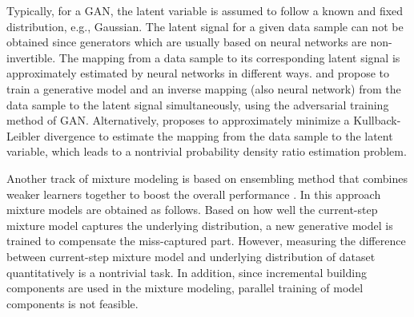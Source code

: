 Typically, for a GAN, the latent variable is assumed to follow a known and fixed distribution, e.g., Gaussian. The latent signal for a given data sample can not be obtained since generators which are usually based on neural networks are non-invertible. The mapping from a data sample to its corresponding latent signal is approximately estimated by neural networks in different ways. \cite{donahue2017adversarial} and \cite{dumoulin2017adversarially} propose to train a
generative model and an inverse mapping (also neural network) from the data sample to the latent signal
simultaneously, using the adversarial training method of
GAN. Alternatively, \cite{dustin2017hierarchical}
proposes to approximately minimize a Kullback-Leibler divergence to
estimate the mapping from the data sample to the latent variable, which leads to a nontrivial probability density ratio estimation problem.

Another track of
mixture modeling is based on ensembling method that combines weaker
learners together to boost the overall performance \cite{grover2017aaai_boost,
  2017arXiv170102386T}. In this approach mixture models are obtained as follows. Based on how well the current-step mixture model captures the underlying distribution, a new generative model is
trained to compensate the miss-captured part. However, measuring the difference between current-step mixture model and underlying distribution
of dataset quantitatively is a nontrivial task. In addition, since incremental building components are used in the mixture modeling, parallel training of model components is not feasible.




